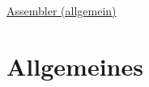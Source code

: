 \raggedright
\footnotesize
\begin{multicols}{3}	
	\setlength{\premulticols}{1pt}
	\setlength{\postmulticols}{1pt}
	\setlength{\multicolsep}{1pt}
	\setlength{\columnsep}{2pt}

\begin{center}
     \Large{\underline{Assembler (allgemein)}} \\
\end{center}

\section{Allgemeines}
\lipsum
\end{multicols}